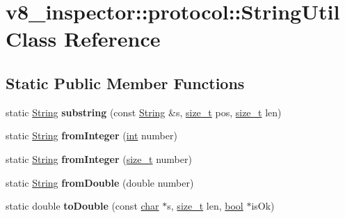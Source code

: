 \hypertarget{classv8__inspector_1_1protocol_1_1StringUtil}{}\section{v8\+\_\+inspector\+:\+:protocol\+:\+:String\+Util Class Reference}
\label{classv8__inspector_1_1protocol_1_1StringUtil}
\subsection*{Static Public Member Functions}
\begin{DoxyCompactItemize}
\item 
\mbox{\label{classv8__inspector_1_1protocol_1_1StringUtil_a4c9652bb852471a5da4a41d645f9591c}} 
static \mbox{\hyperlink{classv8__inspector_1_1String16}{String}} {\bfseries substring} (const \mbox{\hyperlink{classv8__inspector_1_1String16}{String}} \&s, \mbox{\hyperlink{classsize__t}{size\+\_\+t}} pos, \mbox{\hyperlink{classsize__t}{size\+\_\+t}} len)
\item 
\mbox{\label{classv8__inspector_1_1protocol_1_1StringUtil_a86ef76bbd19a7bdf647b5bbfb901856b}} 
static \mbox{\hyperlink{classv8__inspector_1_1String16}{String}} {\bfseries from\+Integer} (\mbox{\hyperlink{classint}{int}} number)
\item 
\mbox{\label{classv8__inspector_1_1protocol_1_1StringUtil_a31bde7c5a45b3ec1b5958e19b76e455c}} 
static \mbox{\hyperlink{classv8__inspector_1_1String16}{String}} {\bfseries from\+Integer} (\mbox{\hyperlink{classsize__t}{size\+\_\+t}} number)
\item 
\mbox{\label{classv8__inspector_1_1protocol_1_1StringUtil_a9a3c471c611609b86d3f0dd53546399c}} 
static \mbox{\hyperlink{classv8__inspector_1_1String16}{String}} {\bfseries from\+Double} (double number)
\item 
\mbox{\label{classv8__inspector_1_1protocol_1_1StringUtil_a8c433013835633513afcdc4dfab31d78}} 
static double {\bfseries to\+Double} (const \mbox{\hyperlink{classchar}{char}} $\ast$s, \mbox{\hyperlink{classsize__t}{size\+\_\+t}} len, \mbox{\hyperlink{classbool}{bool}} $\ast$is\+Ok)

\end{DoxyCompactItemize}
